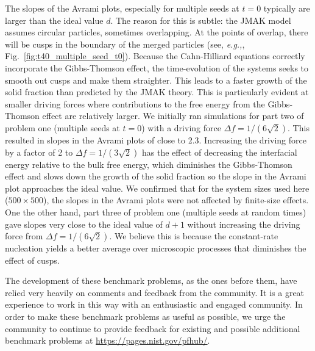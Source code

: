 \documentclass[preprint,12pt]{elsarticle}
\begin{document}
The slopes of the Avrami plots, especially for multiple seeds at $t=0$ typically are larger than the ideal value $d$. The reason for this is subtle: the JMAK model assumes circular particles, sometimes overlapping. At the points of overlap, there will be cusps in the boundary of the merged particles (see, {\em e.g.,}, Fig.~\ref{fig:t40_multiple_seed_t0}). Because the Cahn-Hilliard equations correctly incorporate the Gibbs-Thomson effect, the time-evolution of the systems seeks to smooth out cusps and make them straighter. This leads to a faster growth of the solid fraction than predicted by the JMAK theory. This is particularly evident at smaller driving forces where contributions to the free energy from the Gibbs-Thomson effect are relatively larger. We initially ran simulations for part two of problem one (multiple seeds at $t=0$) with a driving force $\Delta f=1/(6\sqrt{2})$. This resulted in slopes in the Avrami plots of close to 2.3. Increasing the driving force by a factor of 2 to $\Delta f=1/(3\sqrt{2})$ has the effect of decreasing the interfacial energy relative to the bulk free energy, which diminishes the Gibbs-Thomson effect and slows down the growth of the solid fraction so the slope in the Avrami plot approaches the ideal value. We confirmed that for the system sizes used here ($500\times500$), the slopes in the Avrami plots were not affected by finite-size effects. One the other hand, part three of problem one (multiple seeds at random times) gave slopes very close to the ideal value of $d+1$ without increasing the driving force from $\Delta f=1/(6\sqrt{2})$. We believe this is because the constant-rate nucleation yields a better average over microscopic processes that diminishes the effect of cusps. 

The development of these benchmark problems, as the ones before them, have relied very heavily on comments and feedback from the community. It is a great experience to work in this way with an enthusiastic and engaged community. In order to make these benchmark problems as useful as possible, we urge the community to continue to provide feedback for existing and possible additional benchmark problems at \url{https://pages.nist.gov/pfhub/}.
\end{document}
